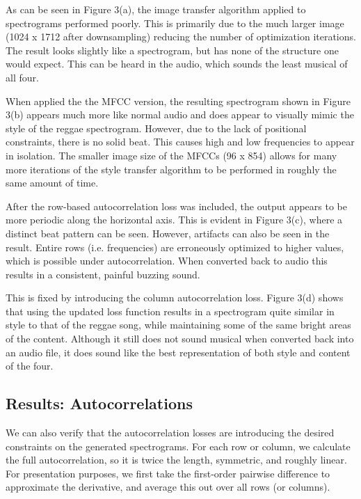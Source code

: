 \documentclass{article}
\begin{document}
As can be seen in Figure 3(a), the image transfer algorithm applied to spectrograms performed poorly. This is primarily due to the much larger image (1024 x 1712 after downsampling) reducing the number of optimization iterations. The result looks slightly like a spectrogram, but has none of the structure one would expect. This can be heard in the audio, which sounds the least musical of all four.

When applied the the MFCC version, the resulting spectrogram shown in Figure 3(b) appears much more like normal audio and does appear to visually mimic the style of the reggae spectrogram. However, due to the lack of positional constraints, there is no solid beat. This causes high and low frequencies to appear in isolation. The smaller image size of the MFCCs (96 x 854) allows for many more iterations of the style transfer algorithm to be performed in roughly the same amount of time.

After the row-based autocorrelation loss was included, the output appears to be more periodic along the horizontal axis. This is evident in Figure 3(c), where a distinct beat pattern can be seen. However, artifacts can also be seen in the result. Entire rows (i.e. frequencies) are erroneously optimized to higher values, which is possible under autocorrelation. When converted back to audio this results in a consistent, painful buzzing sound.

This is fixed by introducing the column autocorrelation loss. Figure 3(d) shows that using the updated loss function results in a spectrogram quite similar in style to that of the reggae song, while maintaining some of the same bright areas of the content. Although it still does not sound musical when converted back into an audio file, it does sound like the best representation of both style and content of the four.

\subsection{Results: Autocorrelations}

We can also verify that the autocorrelation losses are introducing the desired constraints on the generated spectrograms. For each row or column, we calculate the full autocorrelation, so it is twice the length, symmetric, and roughly linear. For presentation purposes, we first take the first-order pairwise difference to approximate the derivative, and average this out over all rows (or columns).
\end{document}
